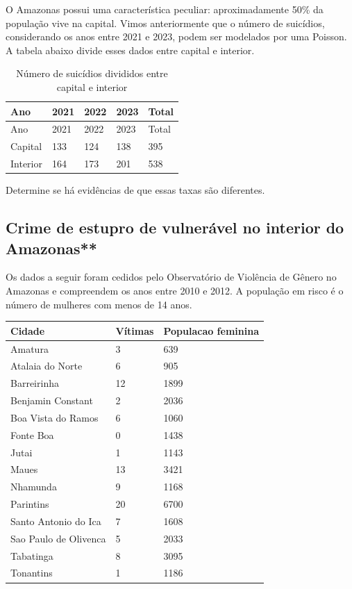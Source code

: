 \documentclass[
  letterpaper,
  DIV=11,
  numbers=noendperiod]{scrreprt}
\theoremstyle{definition}
\theoremstyle{plain}
\theoremstyle{definition}
\theoremstyle{remark}
\begin{document}
O Amazonas possui uma característica peculiar: aproximadamente 50\% da
população vive na capital. Vimos anteriormente que o número de
suicídios, considerando os anos entre 2021 e 2023, podem ser modelados
por uma Poisson. A tabela abaixo divide esses dados entre capital e
interior.

\begin{longtable}[]{@{}lllll@{}}
\caption{Número de suicídios divididos entre capital e
interior}\tabularnewline
\toprule\noalign{}
Ano & 2021 & 2022 & 2023 & Total \\
\midrule\noalign{}
\endfirsthead
\toprule\noalign{}
Ano & 2021 & 2022 & 2023 & Total \\
\midrule\noalign{}
\endhead
\bottomrule\noalign{}
\endlastfoot
Capital & 133 & 124 & 138 & 395 \\
Interior & 164 & 173 & 201 & 538 \\
\end{longtable}

Determine se há evidências de que essas taxas são diferentes.

\subsection{Crime de estupro de vulnerável no interior do
Amazonas**}\label{crime-de-estupro-de-vulneruxe1vel-no-interior-do-amazonas}

Os dados a seguir foram cedidos pelo Observatório de Violência de Gênero
no Amazonas e compreendem os anos entre 2010 e 2012. A população em
risco é o número de mulheres com menos de 14 anos.

\begin{longtable}[]{@{}lll@{}}
\toprule\noalign{}
Cidade & Vítimas & Populacao feminina \\
\midrule\noalign{}
\endhead
\bottomrule\noalign{}
\endlastfoot
Amatura & 3 & 639 \\
Atalaia do Norte & 6 & 905 \\
Barreirinha & 12 & 1899 \\
Benjamin Constant & 2 & 2036 \\
Boa Vista do Ramos & 6 & 1060 \\
Fonte Boa & 0 & 1438 \\
Jutai & 1 & 1143 \\
Maues & 13 & 3421 \\
Nhamunda & 9 & 1168 \\
Parintins & 20 & 6700 \\
Santo Antonio do Ica & 7 & 1608 \\
Sao Paulo de Olivenca & 5 & 2033 \\
Tabatinga & 8 & 3095 \\
Tonantins & 1 & 1186 \\
\end{longtable}
\end{document}
